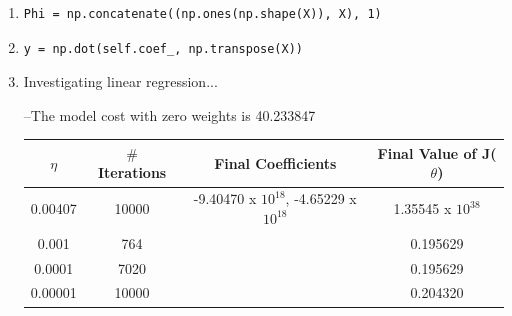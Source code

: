 \documentclass[11pt]{article}
\begin{document}
\begin{enumerate}
\item %
\begin{lstlisting}
Phi = np.concatenate((np.ones(np.shape(X)), X), 1)
\end{lstlisting}

\item %
\begin{lstlisting}
y = np.dot(self.coef_, np.transpose(X))
\end{lstlisting}

\item %
Investigating linear regression...

	 --The model cost with zero weights is 40.233847


\begin{center}
\begin{tabular}{ |c|c|c|c| } 
 \hline
 $\eta$ & $\#$ Iterations & Final Coefficients & Final Value of J($\theta$)\\ 
 \hline
 0.00407 & 10000 & -9.40470 x $10^{18}$, -4.65229 x $10^{18}$ & 1.35545 x $10^{38}$ \\ 
 0.001 & 764 & & 0.195629 \\ 
 0.0001 & 7020 & & 0.195629 \\ 
 0.00001 & 10000 & & 0.204320 \\ 
 \hline
\end{tabular}
\end{center}



\end{enumerate}
\end{document}
